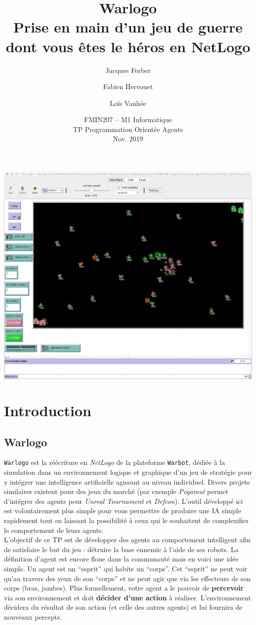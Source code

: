 \documentclass[a4paper,11pt]{article}
\title{{\sc Warlogo}\\{\small Prise en main d'un jeu de guerre dont vous êtes le héros en NetLogo}}
\author{Jacques Ferber \and Fabien Hervouet \and Loïs Vanhée}
\date{FMIN207 -- M1 Informatique\\TP Programmation Orientée Agents \\
Nov. 2019}
\begin{document}
\maketitle


\includegraphics{warlogo.jpg}

\section*{Introduction}


\subsection*{Warlogo}

\texttt{Warlogo} est la réécriture en \textit{NetLogo} de la plateforme \texttt{Warbot}, dédiée à la
simulation dans un environnement logique et graphique d'un jeu de stratégie pour y intégrer une
intelligence artificielle agissant au niveau individuel. Divers projets similaires existent pour des
jeux du marché (par exemple \textit{Pogamut} permet d'intégrer des agents  pour \textit{Unreal
Tournament} et \textit{Defcon}). L'outil développé ici est volontairement plus simple pour vous
permettre de produire une IA simple rapidement tout en laissant la possibilité à ceux qui le
souhaitent de complexifier le comportement de leurs agents.\\

L'objectif de ce TP est de développer des agents au comportement intelligent afin de satisfaire le
but du jeu : détruire la base ennemie à l'aide de ses robots. La définition d'agent est encore floue
dans la communauté mais en voici une idée simple. Un agent est un ``esprit'' qui habite un
``corps''.  Cet ``esprit'' ne peut voir qu'au travers des yeux de son ``corps'' et ne peut agir que
via les effecteurs de son corps (bras, jambes). Plus formellement, votre agent a le pouvoir de
\textbf{percevoir} via son environnement et doit \textbf{décider d'une action} à réaliser.
L'environnement décidera du résultat de son action (et celle des autres agents) et lui fournira de
nouveaux percepts.\\
\end{document}
